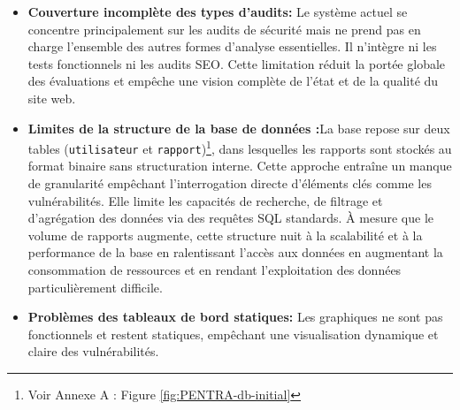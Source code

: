 \begin{itemize}[label=\textcolor{red}{}]
\begin{itemize}[label=$\bullet$, left=-0.05cm]
                    \item \textbf{Mauvaise gestion des scans simultanés:} Le système actuel ne gère pas correctement les lancements parallèles ou successifs de plusieurs scans par le même utilisateur ou par plusieurs utilisateurs. Cela provoque une surcharge du backend, des conflits d’accès aux ressources, voire un blocage partiel de l’application. De plus, certains outils sont déclenchés plusieurs fois en parallèle, entraînant des erreurs d’exécution et empêchant la génération des rapports.
                    \item \textbf{Diffusion des rapports limitée :} Les e-mails contenant les rapports\footnote{Voir annexe A: Figure \ref{fig:PENTRA-V1-email}} sont trop basiques manquent de clarté et de modernité. Par ailleurs, l’envoi des rapports via Slack et Jira ne fonctionne pas de manière fiable. L’absence d’options de téléchargement aux formats HTML, JSON et CSV limite l’exportation et rend difficile l’analyse approfondie des résultats ou leur intégration avec d’autres outils.
                \end{itemize}
            \item \textbf{Couverture incomplète des types d’audits:} Le système actuel se concentre principalement sur les audits de sécurité mais ne prend pas en charge l’ensemble des autres formes d’analyse essentielles. Il n’intègre ni les tests fonctionnels ni les audits SEO. Cette limitation réduit la portée globale des évaluations et empêche une vision complète de l’état et de la qualité du site web.
            \item \textbf{Limites de la structure de la base de données :}La base repose sur deux tables (\texttt{utilisateur} et \texttt{rapport})\footnote{Voir Annexe A : Figure \ref{fig:PENTRA-db-initial}}, dans lesquelles les rapports sont stockés au format binaire sans structuration interne. Cette approche entraîne un manque de granularité empêchant l’interrogation directe d’éléments clés comme les vulnérabilités. Elle limite les capacités de recherche, de filtrage et d’agrégation des données via des requêtes SQL standards. À mesure que le volume de rapports augmente, cette structure nuit à la scalabilité et à la performance de la base en ralentissant l’accès aux données en augmentant la consommation de ressources et en rendant l’exploitation des données particulièrement difficile.
            \item \textbf{Problèmes des tableaux de bord statiques:} Les graphiques ne sont pas fonctionnels et restent statiques, empêchant une visualisation dynamique et claire des vulnérabilités. 

\end{itemize}
